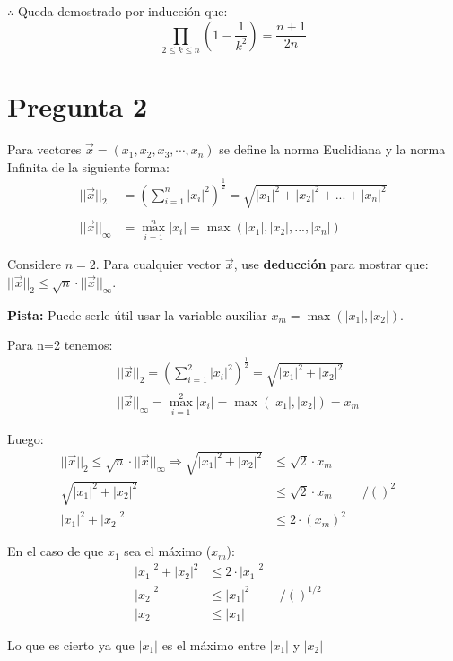 \documentclass[spanish, fleqn]{article}
\begin{document}
$\therefore$ Queda demostrado por inducción que:
\[
\prod_{2 \leq k \leq n} \left( 1 - \frac{1}{k^2} \right) = \frac{n+1}{2n}
\]


\section*{Pregunta 2}
Para vectores \( \vec{x} = (x_1, x_2, x_3, \cdots, x_n) \) se define la norma Euclidiana y la norma Infinita de la siguiente forma:
\begin{align*}
	|| \vec{x} ||_2 &= 
    \left(
    \sum_{i=1}^{n} | x_i |^2
    \right)^\frac{1}{2}  = \sqrt{|x_1|^2+|x_2|^2+ ... + |x_n|^2}\\
    &\\
    || \vec{x} ||_{\infty} &= 
    \max_{i=1}^{n} |x_i| =  \max(|x_1|,|x_2|,...,|x_n|) 
\end{align*}

Considere \(n = 2\). Para cualquier vector \( \vec{x} \), use \textbf{deducción} para mostrar que:
$|| \vec{x} ||_2 \leq \sqrt{n} \cdot  || \vec{x} ||_{\infty}$.

\textbf{Pista:} Puede serle útil usar la variable auxiliar \(x_m = \max(|x_1|, |x_2|)\).

Para n=2 tenemos:
\begin{align*}
	&|| \vec{x} ||_2 = \left( \sum_{i=1}^{2} | x_i |^2 \right)^\frac{1}{2}  = \sqrt{|x_1|^2+|x_2|^2}\\
    &|| \vec{x} ||_{\infty} =  \max_{i=1}^{2} |x_i| =  \max(|x_1|,|x_2|)=x_m 
\end{align*}

Luego:
\begin{align*}
|| \vec{x} ||_2 \leq \sqrt{n} \cdot  || \vec{x} ||_{\infty}\Rightarrow \sqrt{|x_1|^2+|x_2|^2}&\leq\sqrt{2}\cdot x_m&\\
\sqrt{|x_1|^2+|x_2|^2}&\leq\sqrt{2}\cdot x_m \hspace{1cm}/()^2&\\
|x_1|^2+|x_2|^2&\leq2\cdot (x_m)^2&
\end{align*}

En el caso de que $x_1$ sea el máximo ($x_m$):
\begin{align*}
|x_1|^2+|x_2|^2&\leq2\cdot |x_1|^2&\\
|x_2|^2&\leq|x_1|^2 \hspace{1cm}/()^{1/2}&\\
|x_2| &\leq|x_1|
\end{align*}

Lo que es cierto ya que $|x_1|$ es el máximo entre $|x_1|$ y $|x_2|$
\end{document}

